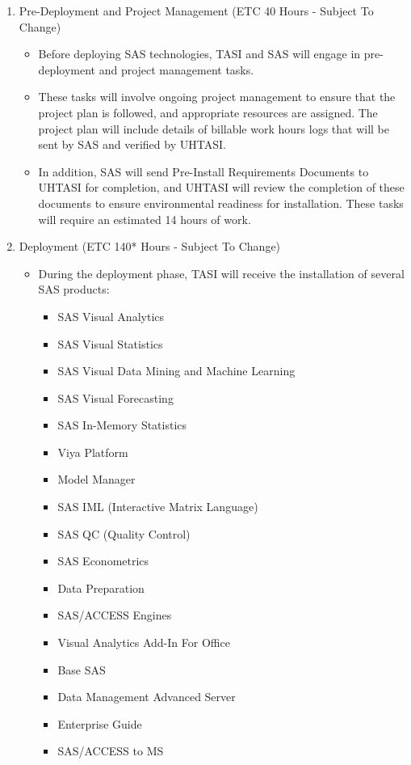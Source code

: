 \begin{enumerate} 
    \item Pre-Deployment and Project Management (ETC 40 Hours - Subject To Change)
    \begin{itemize}
        \item Before deploying SAS technologies, TASI and SAS will engage in pre-deployment and project management tasks. 
        \item These tasks will involve ongoing project management to ensure that the project plan is followed, and appropriate resources are assigned. The project plan will include details of billable work hours logs that will be sent by SAS and verified by UHTASI. 
        \item In addition, SAS will send Pre-Install Requirements Documents to UHTASI for completion, and UHTASI will review the completion of these documents to ensure environmental readiness for installation. These tasks will require an estimated 14 hours of work.
    \end{itemize}
    \item Deployment (ETC 140* Hours - Subject To Change)
    \begin{itemize}
        \item During the deployment phase, TASI will receive the installation of several SAS products:
        \begin{itemize}
            \item SAS Visual Analytics
            \item SAS Visual Statistics
            \item SAS Visual Data Mining and Machine Learning
            \item SAS Visual Forecasting
            \item SAS In-Memory Statistics
            \item Viya Platform
            \item Model Manager
            \item SAS IML (Interactive Matrix Language)
            \item SAS QC (Quality Control)
            \item SAS Econometrics
            \item Data Preparation
            \item SAS/ACCESS Engines
            \item Visual Analytics Add-In For Office
            \item Base SAS
            \item Data Management Advanced Server
            \item Enterprise Guide
            \item SAS/ACCESS to MS
        \end{itemize}
    \end{itemize}
\end{enumerate}

